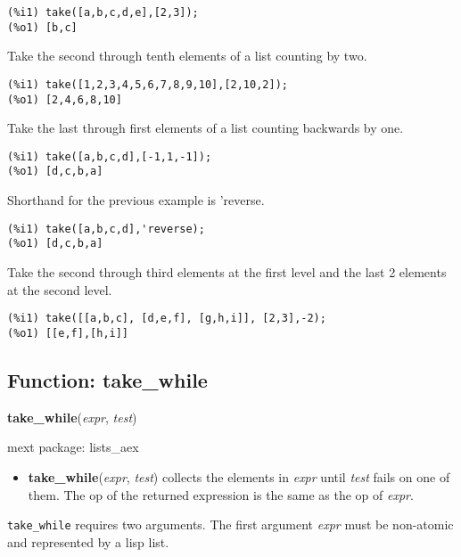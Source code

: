\documentclass[]{article}
\begin{document}
\begin{Verbatim}[frame=single]
(%i1) take([a,b,c,d,e],[2,3]);
(%o1) [b,c]
\end{Verbatim}

   Take the second through tenth elements of a list counting by two. 

\begin{Verbatim}[frame=single]
(%i1) take([1,2,3,4,5,6,7,8,9,10],[2,10,2]);
(%o1) [2,4,6,8,10]
\end{Verbatim}

   Take the last through first elements of a list counting backwards by one. 

\begin{Verbatim}[frame=single]
(%i1) take([a,b,c,d],[-1,1,-1]);
(%o1) [d,c,b,a]
\end{Verbatim}

   Shorthand for the previous example is 'reverse. 

\begin{Verbatim}[frame=single]
(%i1) take([a,b,c,d],'reverse);
(%o1) [d,c,b,a]
\end{Verbatim}

   Take the second through third elements at the first level and the last 2 
   elements at the second level. 

\begin{Verbatim}[frame=single]
(%i1) take([[a,b,c], [d,e,f], [g,h,i]], [2,3],-2);
(%o1) [[e,f],[h,i]]
\end{Verbatim}


\subsection{Function: take\_while\label{sec:take_while}}
\hypertarget{take_while}{}
{\bf take\_while}({\it expr}, {\it test})


\noindent mext package: lists\_aex



\vspace{5 pt}
\begin{itemize}
\item[] {\bf take\_while}({\it expr}, {\it test})
  collects the elements in {\it expr} until {\it test} fails on one of them. The op of the returned expression is the same as the op of {\it expr}. 

\end{itemize}
   {\tt take\_while} requires two arguments.
    The first argument {\it expr} must be non-atomic and represented by a lisp list.
\end{document}
